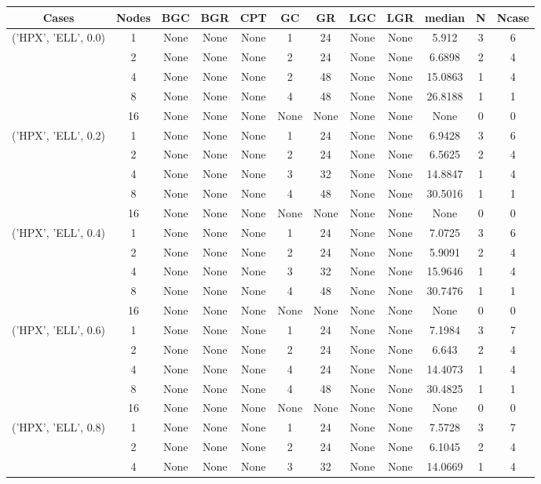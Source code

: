\begin{tabular}{cccccccccccc}
\hline
Cases & Nodes& BGC& BGR& CPT& GC& GR& LGC& LGR& median & N & Ncase \\
\hline
\multirow{5}{*}{('HPX', 'ELL', 0.0)}& 1& None& None& None& 1& 24& None& None& 5.912& 3& 6\\
& 2& None& None& None& 2& 24& None& None& 6.6898& 2& 4\\
& 4& None& None& None& 2& 48& None& None& 15.0863& 1& 4\\
& 8& None& None& None& 4& 48& None& None& 26.8188& 1& 1\\
& 16& None& None& None& None& None& None& None& None& 0& 0\\
\hline
\multirow{5}{*}{('HPX', 'ELL', 0.2)}& 1& None& None& None& 1& 24& None& None& 6.9428& 3& 6\\
& 2& None& None& None& 2& 24& None& None& 6.5625& 2& 4\\
& 4& None& None& None& 3& 32& None& None& 14.8847& 1& 4\\
& 8& None& None& None& 4& 48& None& None& 30.5016& 1& 1\\
& 16& None& None& None& None& None& None& None& None& 0& 0\\
\hline
\multirow{5}{*}{('HPX', 'ELL', 0.4)}& 1& None& None& None& 1& 24& None& None& 7.0725& 3& 6\\
& 2& None& None& None& 2& 24& None& None& 5.9091& 2& 4\\
& 4& None& None& None& 3& 32& None& None& 15.9646& 1& 4\\
& 8& None& None& None& 4& 48& None& None& 30.7476& 1& 1\\
& 16& None& None& None& None& None& None& None& None& 0& 0\\
\hline
\multirow{5}{*}{('HPX', 'ELL', 0.6)}& 1& None& None& None& 1& 24& None& None& 7.1984& 3& 7\\
& 2& None& None& None& 2& 24& None& None& 6.643& 2& 4\\
& 4& None& None& None& 4& 24& None& None& 14.4073& 1& 4\\
& 8& None& None& None& 4& 48& None& None& 30.4825& 1& 1\\
& 16& None& None& None& None& None& None& None& None& 0& 0\\
\hline
\multirow{5}{*}{('HPX', 'ELL', 0.8)}& 1& None& None& None& 1& 24& None& None& 7.5728& 3& 7\\
& 2& None& None& None& 2& 24& None& None& 6.1045& 2& 4\\
& 4& None& None& None& 3& 32& None& None& 14.0669& 1& 4\\

\end{tabular}
